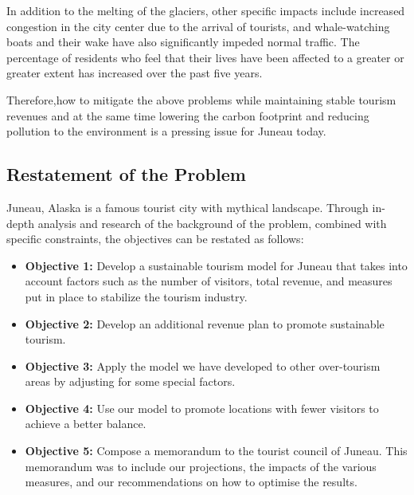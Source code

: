 \documentclass{mcmthesis}
\begin{document}
{In addition to the melting of the glaciers, other specific impacts include increased congestion in the city center due to the arrival of tourists, and whale-watching boats and their wake have also significantly impeded normal traffic. The percentage of residents who feel that their lives have been affected to a greater or greater extent has increased over the past five years.}

{Therefore,how to mitigate the above problems while maintaining stable tourism revenues and at the same time lowering the carbon footprint and reducing pollution to the environment is a pressing issue for Juneau today.}

\subsection{Restatement of the Problem}
{Juneau, Alaska is a famous tourist city with mythical landscape. Through in-depth analysis and research of the background of the problem, combined with specific constraints, the objectives can be restated as follows:}
\begin{itemize}
  \item \textbf{Objective 1: }Develop a sustainable tourism model for Juneau that takes into account factors such as the number of visitors, total revenue, and measures put in place to stabilize the tourism industry.
  \item \textbf{Objective 2: }Develop an additional revenue plan to promote sustainable tourism.
  \item \textbf{Objective 3: }Apply the model we have developed to other over-tourism areas by adjusting for some special factors.
  \item \textbf{Objective 4: }Use our model to promote locations with fewer visitors to achieve a better balance.
  \item \textbf{Objective 5: }Compose a memorandum to the tourist council of Juneau. This  memorandum was to include our projections, the impacts of the various measures, and our recommendations on how to optimise the results.
\end{itemize}


\end{document}
